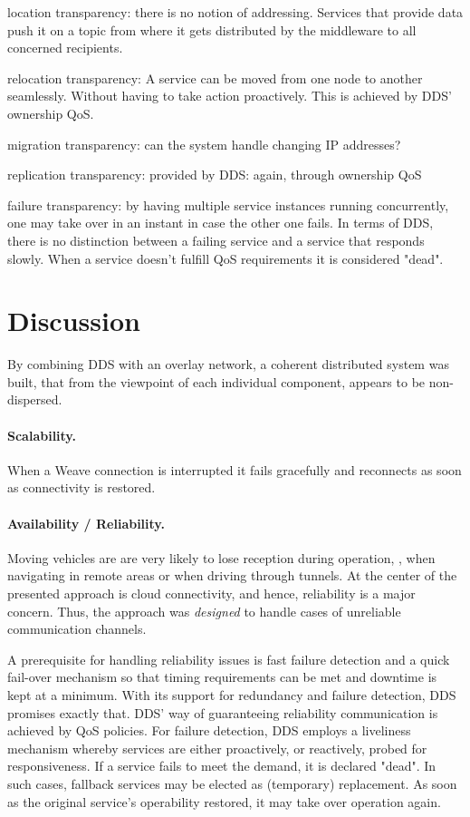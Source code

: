 location transparency: there is no notion of addressing. Services that provide data push it on a topic from where it gets distributed by the middleware to all concerned recipients.

relocation transparency: A service can be moved from one node to another seamlessly. Without having to take action proactively. This is achieved by DDS' ownership QoS.

migration transparency: can the system handle changing IP addresses?

replication transparency: provided by DDS: again, through ownership QoS

failure transparency: by having multiple service instances running concurrently, one may take over in an instant in case the other one fails. In terms of DDS, there is no distinction between a failing service and a service that responds slowly. When a service doesn't fulfill QoS requirements it is considered "dead".






\section{Discussion}



By combining DDS with an overlay network, a coherent distributed system \cite{tanenbaum2017distributed} was built, that from the viewpoint of each individual component, appears to be non-dispersed.

\paragraph{Scalability.}
When a Weave connection is interrupted it fails gracefully and reconnects as soon as connectivity is restored.

\paragraph{Availability / Reliability.}
Moving vehicles are are very likely to lose reception during operation, \eg , when navigating in remote areas or when driving through tunnels. At the center of the presented approach is cloud connectivity, and hence, reliability is a major concern. Thus, the approach was \emph{designed} to handle cases of unreliable communication channels.

A prerequisite for handling reliability issues is fast failure detection and a quick fail-over mechanism so that timing requirements can be met and downtime is kept at a minimum. With its support for redundancy and failure detection, DDS promises exactly that. DDS' way of guaranteeing reliability communication is achieved by QoS policies. For failure detection, DDS employs a liveliness mechanism whereby services are either proactively, or reactively, probed for responsiveness. If a service fails to meet the demand, it is declared "dead". In such cases, fallback services may be elected as (temporary) replacement. As soon as the original service's operability restored, it may take over operation again.

